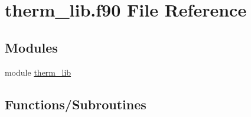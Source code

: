 \hypertarget{therm__lib_8f90}{}\section{therm\+\_\+lib.\+f90 File Reference}
\label{therm__lib_8f90}
\subsection*{Modules}
\begin{DoxyCompactItemize}
\item 
module \hyperlink{namespacetherm__lib}{therm\+\_\+lib}
\end{DoxyCompactItemize}
\subsection*{Functions/\+Subroutines}
